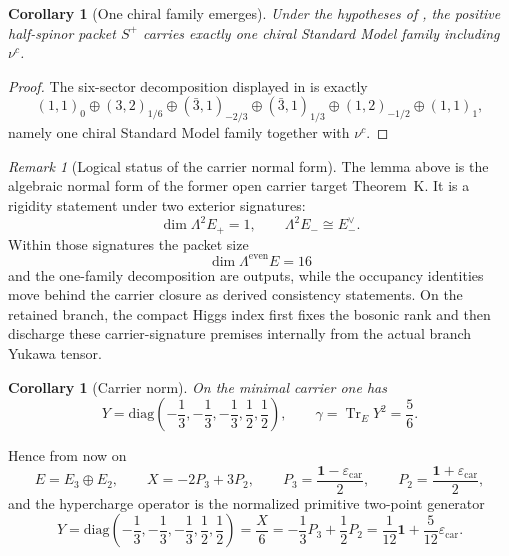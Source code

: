 \documentclass[11pt,a4paper]{article}
\newtheorem{corollary}[theorem]{Corollary}
\theoremstyle{definition}
\theoremstyle{remark}
\newtheorem*{remark}{Remark}
\DeclareMathOperator{\tr}{Tr}
\newcommand{\epscar}{\varepsilon_{\mathrm{car}}}
\begin{document}
\begin{corollary}[One chiral family emerges]
Under the hypotheses of , the positive half-spinor packet $S^+$
carries exactly one chiral Standard Model family including $\nu^c$.
\end{corollary}

\begin{proof}
The six-sector decomposition displayed in  is exactly
\[
(1,1)_0\oplus(3,2)_{1/6}\oplus(\bar 3,1)_{-2/3}\oplus(\bar 3,1)_{1/3}\oplus(1,2)_{-1/2}\oplus(1,1)_1,
\]
namely one chiral Standard Model family together with $\nu^c$.
\end{proof}

\begin{remark}[Logical status of the carrier normal form]
The lemma above is the algebraic normal form of the former open carrier target Theorem~K. It is a rigidity
statement under two exterior signatures:
\[
\dim \Lambda^2 E_+=1,
\qquad
\Lambda^2 E_- \cong E_-^\vee.
\]
Within those signatures the packet size
\[
\dim\Lambda^{\mathrm{even}}E=16
\]
and the one-family decomposition are outputs, while the occupancy identities move behind the
carrier closure as derived consistency statements. On the retained branch, the compact Higgs index
first fixes the bosonic rank and  then
discharge these carrier-signature premises internally from the actual branch Yukawa tensor.
\end{remark}

\begin{corollary}[Carrier norm]
On the minimal carrier one has
\[
Y
=
\mathrm{diag}\!\left(-\frac13,-\frac13,-\frac13,\frac12,\frac12\right),
\qquad
\gamma=\tr_EY^2=\frac56.
\]
\end{corollary}

Hence from now on
\[
E=E_3\oplus E_2,
\qquad
X=-2P_3+3P_2,
\qquad
P_3=\frac{\mathbf 1-\epscar}{2},
\qquad
P_2=\frac{\mathbf 1+\epscar}{2},
\]
and the hypercharge operator is the normalized primitive two-point generator
\begin{equation}
\label{eq:explicit-hypercharge}
Y
=
\mathrm{diag}\!\left(-\frac13,-\frac13,-\frac13,\frac12,\frac12\right)
=
\frac{X}{6}
=
-\frac13 P_3+\frac12 P_2
=
\frac1{12}\mathbf 1+\frac5{12}\epscar.
\end{equation}
\end{document}
